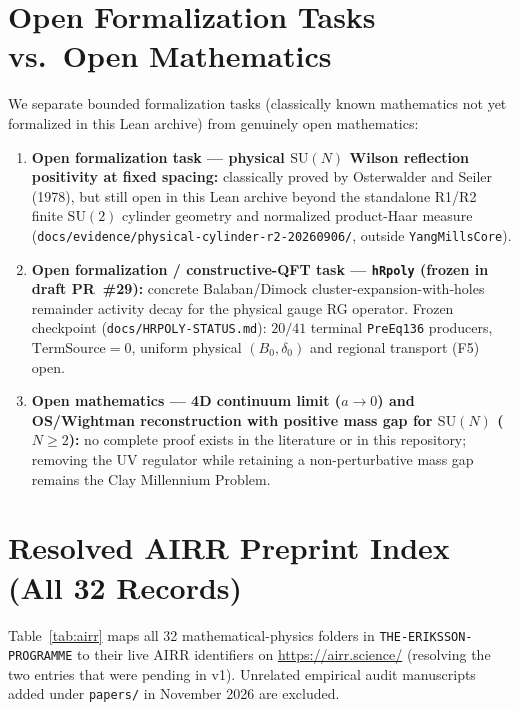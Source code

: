 \documentclass[11pt]{article}
\begin{document}
\section{Open Formalization Tasks vs.\ Open Mathematics}

We separate bounded formalization tasks (classically known mathematics not yet formalized
in this Lean archive) from genuinely open mathematics:

\begin{enumerate}
  \item \textbf{Open formalization task — physical $\mathrm{SU}(N)$ Wilson reflection
  positivity at fixed spacing:} classically proved by Osterwalder and Seiler (1978), but
  still open in this Lean archive beyond the standalone R1/R2 finite $\mathrm{SU}(2)$
  cylinder geometry and normalized product-Haar measure
  (\texttt{docs/evidence/physical-cylinder-r2-20260906/}, outside \texttt{YangMillsCore}).
  \item \textbf{Open formalization / constructive-QFT task — \texttt{hRpoly} (frozen in
  draft PR~\#29):} concrete Balaban/Dimock cluster-expansion-with-holes remainder activity
  decay for the physical gauge RG operator. Frozen checkpoint (\texttt{docs/HRPOLY-STATUS.md}):
  $20/41$ terminal \texttt{PreEq136} producers, $\mathrm{TermSource}=0$, uniform physical
  $(B_0,\delta_0)$ and regional transport (F5) open.
  \item \textbf{Open mathematics — 4D continuum limit ($a \to 0$) and OS/Wightman
  reconstruction with positive mass gap for $\mathrm{SU}(N)$ ($N \ge 2$):} no complete
  proof exists in the literature or in this repository; removing the UV regulator while
  retaining a non-perturbative mass gap remains the Clay Millennium Problem.
\end{enumerate}

\section{Resolved AIRR Preprint Index (All 32 Records)}

Table~\ref{tab:airr} maps all 32 mathematical-physics folders in
\texttt{THE-ERIKSSON-PROGRAMME} to their live AIRR identifiers on
\url{https://airr.science/} (resolving the two entries that were pending in v1). Unrelated
empirical audit manuscripts added under \texttt{papers/} in November 2026 are excluded.
\end{document}
